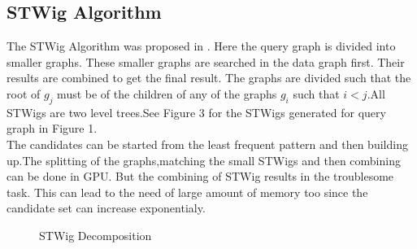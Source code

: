 \subsection{STWig Algorithm}
\label{sec:stwig}
	\hspace{10mm}The STWig Algorithm was proposed in \cite{STWig}. Here the query graph is divided into smaller graphs. These smaller graphs are searched in the data graph first. Their results are combined to get the final result. The graphs are divided such that the root of $g_j$ must be of the children of any of the graphs $g_i$ such that $i<j$.All STWigs are two level trees.See Figure 3 for the STWigs generated for query graph in Figure 1.
\\	\hspace{10mm}The candidates can be started from the least frequent pattern and then building up.The splitting of the graphs,matching the small STWigs and then combining can be done in GPU. But the combining of STWig results in the troublesome task. This can lead to the need of large amount of memory too since the candidate set can increase exponentialy.
	\begin{figure}[h]
 \centering
\begin{minipage}{.24\textwidth}
\end{minipage}
\begin{minipage}{.24\textwidth}
\end{minipage}
\begin{minipage}{.24\textwidth}
\end{minipage}
\begin{minipage}{.24\textwidth}
\end{minipage}
 \caption{STWig Decomposition}
\end{figure}
 
